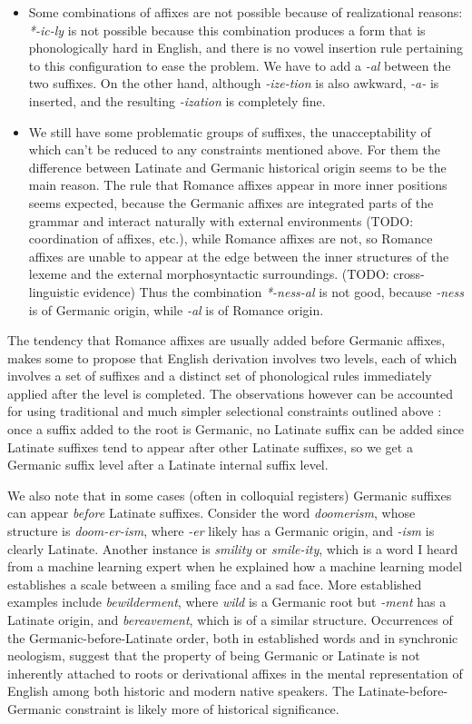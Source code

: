 \documentclass[UTF8, a4paper, oneside, scheme=plain, 12pt]{ctexbook}
\newcommand{\form}[1]{\emph{#1}}
\begin{document}
\begin{itemize}
    \item Some combinations of affixes are not possible because of realizational reasons:
    \form{*-ic-ly} is not possible 
    because this combination produces a form 
    that is phonologically hard in English,
    and there is no vowel insertion rule pertaining to this configuration to ease the problem.
    We have to add a \form{-al} between the two suffixes.
    On the other hand, although \form{-ize-tion} is also awkward,
    \form{-a-} is inserted, and the resulting \form{-ization} is completely fine.
    \item We still have some problematic groups of suffixes,
    the unacceptability of which can't be reduced to any constraints mentioned above.
    For them the difference
    between Latinate and Germanic historical origin 
    seems to be the main reason.
    The rule that Romance affixes appear in more inner positions seems expected,
    because the Germanic affixes are integrated parts of the grammar 
    and interact naturally with external environments
    (TODO: coordination of affixes, etc.),
    while Romance affixes are not,
    so Romance affixes are unable to appear at the edge 
    between the inner structures of the lexeme and the external morphosyntactic surroundings.
    (TODO: cross-linguistic evidence)
    Thus the combination \form{*-ness-al} is not good,
    because \form{-ness} is of Germanic origin,
    while \form{-al} is of Romance origin.
\end{itemize}

The tendency that Romance affixes are usually added before Germanic affixes,
makes some to propose that English derivation 
involves two levels, 
each of which involves a set of suffixes 
and a distinct set of phonological rules immediately applied after the level is completed.
The observations however can be accounted for 
using traditional and much simpler selectional constraints outlined above \citep{fabb1988english}:
once a suffix added to the root is Germanic,
no Latinate suffix can be added 
since Latinate suffixes tend to appear after other Latinate suffixes,
so we get a Germanic suffix level after a Latinate internal suffix level.

We also note that in some cases (often in colloquial registers)
Germanic suffixes can appear \emph{before} Latinate suffixes.
Consider the word \form{doomerism}, whose structure is \form{doom-er-ism},
where \form{-er} likely has a Germanic origin,
and \form{-ism} is clearly Latinate.
Another instance is \form{smility} or \form{smile-ity}, which is a word I heard from a machine learning expert
when he explained how a machine learning model establishes a scale between a smiling face and a sad face.
More established examples include \form{bewilderment},
where \form{wild} is a Germanic root but \form{-ment} has a Latinate origin,
and \form{bereavement}, which is of a similar structure.
Occurrences of the Germanic-before-Latinate order,
both in established words and in synchronic neologism,
suggest that the property of being Germanic or Latinate is not
inherently attached to roots or derivational affixes
in the mental representation of English among both historic and modern native speakers.
The Latinate-before-Germanic constraint is likely more of historical significance.
\end{document}
